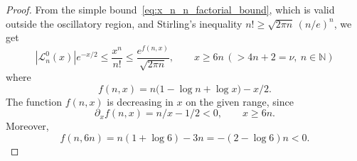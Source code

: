 \documentclass[11pt]{amsart}
\numberwithin{equation}{section}
\newcommand{\N}{{\mathbb N}}
\begin{document}
\begin{proof}
    
    From the simple bound~\eqref{eq:x_n_n_factorial_bound}, which is valid outside the oscillatory region, and Stirling's inequality $n!\geq\sqrt{2\pi n} \, (n/e)^n$, we get
    \begin{equation}\label{eq:pointwise_tail_bound}
        \left|\mathcal L^0_n(x)\right|e^{-x/2}
        \leq \frac{x^n}{n!}
        \leq \frac{e^{f(n,x)}}{\sqrt{2 \pi n}},
        \qquad x \geq 6n \,(> 4n+2=\nu, \ n \in \N)
    \end{equation}
    where
    \begin{equation}
        f(n,x)=n\bigl(1-\log n+\log x\bigr)-x/2.
    \end{equation}
    The function $f(n,x)$ is decreasing in $x$ on the given range, since
    \begin{equation}
        \partial_x f(n,x)=n/x-1/2<0,
        \qquad x\geq6n.
    \end{equation}
    Moreover,
    \begin{equation}\label{eq:f_6n}
        f(n,6n)=n(1+\log6)-3n=-(2-\log6)n<0.
    \end{equation}


\end{proof}
\end{document}
